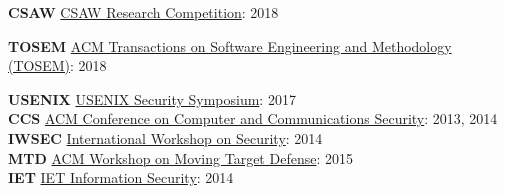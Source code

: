 

\begin{cvparagraph}
    \textbf{CSAW}  \hspace*{1pt} \href{https://csaw.engineering.nyu.edu/}{CSAW Research Competition}: 2018
\end{cvparagraph}


\begin{cvparagraph}
    \textbf{TOSEM} \hspace*{1pt} \href{https://tosem.acm.org/} {ACM Transactions on Software Engineering and Methodology (TOSEM)}: 2018
\end{cvparagraph}


\begin{cvparagraph}
    \textbf{USENIX} \hspace*{1pt} \href{https://www.usenix.org/conference/usenixsecurity17} {USENIX Security Symposium}: 2017\\
    \textbf{CCS} \hspace*{17pt} \href{https://www.sigsac.org/ccs/CCS2014/}
        {ACM Conference on Computer and Communications Security}: 2013, 2014\\
    \textbf{IWSEC} \hspace*{6pt} \href{http://www.iwsec.org/2014/}{International Workshop on Security}: 2014 \\
    \textbf{MTD} \hspace*{15pt}
    \href{http://mtd.mobicloud.asu.edu/}{ACM Workshop on Moving Target Defense}: 2015\\
    \textbf{IET} \hspace*{20pt}
    \href{http://digital-library.theiet.org/content/journals/iet-ifs}{IET Information Security}: 2014
\end{cvparagraph}
